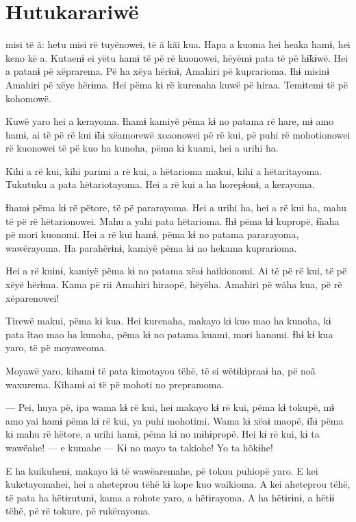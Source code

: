 \chapter{Hutukarariwë}
 
 misi të ã: hetu misi rë tuyënowei, të ã kãi kua. Hapa a kuoma hei
heaka hamɨ, hei keno kë a. Kutaenɨ ei yëtu hamɨ të pë rë kuonowei,
hëyëmɨ pata të pë hɨ̃kɨwë. Hei a patanɨ pë xëprarema. Pë ha xëya hërɨnɨ,
Amahiri pë kuprarioma. Ɨhɨ misinɨ Amahiri pë xëye hërɨma. Hei pëma kɨ rë
kurenaha kuwë pë hiraa. Temɨtemɨ të pë kohomowë.

Kuwë yaro hei a kerayoma. Ɨhamɨ kamiyë pëma kɨ no patama rë hare, mɨ amo
hamɨ, ai të pë rë kui ɨ̃hɨ xëamorewë xoaonowei pë rë kui, pë puhi rë
mohotionowei rë kuonowei të pë kuo ha kunoha, pëma kɨ kuami, hei a urihi
ha.

Kihi a rë kui, kihi parimi a rë kui, a hëtarioma makui, kihi a
hëtaritayoma. Tukutuku a pata hëtariotayoma. Hei a rë kui a ha
horepɨonɨ, a kerayoma.

Ɨhamɨ pëma kɨ rë pëtore, të pë pararayoma. Hei a urihi ha, hei a rë kui
ha, mahu të pë rë hëtarionowei. Mahu a yahi pata hëtarioma. Ɨhɨ pëma kɨ
kupropë, ɨ̃naha pë mori kuonomi. Hei a rë kui hamɨ, pëma kɨ no patama
pararayoma, wawërayoma. Ha parahërɨnɨ, kamiyë pëma kɨ no hekama
kuprarioma.

Hei a rë kuinɨ, kamiyë pëma kɨ no patama xëaɨ haikionomi. Ai të pë rë
kui, të pë xëyë hërɨma. Kama pë rii Amahiri hiraopë, hëyëha. Amahiri pë
wãha kua, pë rë xëparenowei!

Tirewë makui, pëma kɨ kua. Hei kurenaha, makayo kɨ kuo mao ha kunoha, kɨ
pata ĩtao mao ha kunoha, pëma kɨ no patama kuami, mori hanomi. Ɨhɨ kɨ
kua yaro, të pë moyaweoma.

Moyawë yaro, kihamɨ të pata kimotayou tëhë, të si wëtɨkɨpraaɨ ha, pë noã
waxurema. Kihamɨ ai të pë mohoti no prepramoma.

--- Pei, huya pë, ipa wama kɨ rë kui, hei makayo kɨ rë kui, pëma kɨ
tokupë, mɨ amo yai hamɨ pëma kɨ rë kui, ya puhi mohotimi. Wama kɨ xëaɨ
maopë, ɨ̃hɨ pëma kɨ mahu rë hëtore, a urihi hamɨ, pëma kɨ no mɨhɨpropë.
Hei kɨ rë kui, kɨ ta wawëahe! --- e kumahe --- Kɨ no mayo ta takiohe! Yo
ta hõkɨhe!

E ha kuikuhenɨ, makayo kɨ të wawëaremahe, pë tokuu puhiopë yaro. E kei
kuketayomahei, hei a aheteprou tëhë kɨ kope kuo waikioma. A kei
aheteprou tëhë, të pata ha hëtɨrutunɨ, kama a rohote yaro, a hëtɨrayoma.
A ha hëtɨrɨnɨ, a hëtɨɨ tëhë, pë rë tokure, pë rukërayoma.

